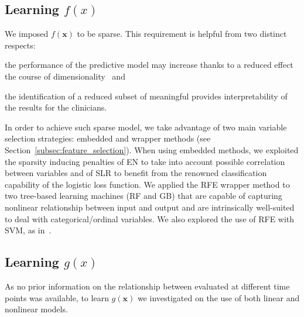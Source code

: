 \subsection{Learning $f(x)$} \label{sec:learning_f}


We imposed $f(\bm{x})$ to be sparse. This requirement is helpful from two distinct respects:
\begin{enumerate*}[label=\alph*)]
	\item the performance of the predictive model may increase thanks to a reduced effect the course of dimensionality~\cite{hastie2015statistical} and
	\item the identification of a reduced subset of meaningful \PCOs provides interpretability of the results for the clinicians.
\end{enumerate*}
In order to achieve such sparse model, we take advantage of two main variable selection strategies: embedded and wrapper methods (see Section~\ref{subsec:feature_selection}).
When using embedded methods, we exploited the sparsity inducing penalties of EN to take into account possible correlation between \PCO variables and of SLR to benefit from the renowned classification capability of the logistic loss function.
We applied the RFE wrapper method to
two tree-based learning machines (RF and GB) that are capable of capturing nonlinear relationship between input and output and are intrinsically well-suited to deal with categorical/ordinal variables. We also explored the use of RFE with SVM, as in~\cite{guyon2002gene}.

\subsection{Learning $g(x)$}

As no prior information on the relationship between \PCOs evaluated at different time points was available, to learn $g(\bm{x})$ we investigated on the use of both linear and nonlinear models.

